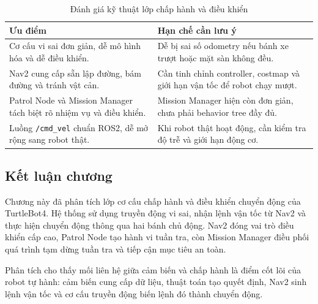 \begin{table}[H]
    \centering
    \caption{Đánh giá kỹ thuật lớp chấp hành và điều khiển}
    \label{tab:actuator-control-assessment}
    \renewcommand{\arraystretch}{1.25}
    \small
    \begin{tabularx}{\textwidth}{|>{\raggedright\arraybackslash}X|>{\raggedright\arraybackslash}X|}
        \hline
        \textbf{Ưu điểm} & \textbf{Hạn chế cần lưu ý} \\
        \hline
        Cơ cấu vi sai đơn giản, dễ mô hình hóa và dễ điều khiển. & Dễ bị sai số odometry nếu bánh xe trượt hoặc mặt sàn không đều. \\
        \hline
        Nav2 cung cấp sẵn lập đường, bám đường và tránh vật cản. & Cần tinh chỉnh controller, costmap và giới hạn vận tốc để robot chạy mượt. \\
        \hline
        Patrol Node và Mission Manager tách biệt rõ nhiệm vụ và điều khiển. & Mission Manager hiện còn đơn giản, chưa phải behavior tree đầy đủ. \\
        \hline
        Luồng \texttt{/cmd\_vel} chuẩn ROS2, dễ mở rộng sang robot thật. & Khi robot thật hoạt động, cần kiểm tra độ trễ và giới hạn động cơ. \\
        \hline
    \end{tabularx}
\end{table}

\subsection{Kết luận chương}
\label{subsec:actuator-control-conclusion}

Chương này đã phân tích lớp cơ cấu chấp hành và điều khiển chuyển động của TurtleBot4. Hệ thống sử dụng truyền động vi sai, nhận lệnh vận tốc từ Nav2 và thực hiện chuyển động thông qua hai bánh chủ động. Nav2 đóng vai trò điều khiển cấp cao, Patrol Node tạo hành vi tuần tra, còn Mission Manager điều phối quá trình tạm dừng tuần tra và tiếp cận mục tiêu an toàn.

Phân tích cho thấy mối liên hệ giữa cảm biến và chấp hành là điểm cốt lõi của robot tự hành: cảm biến cung cấp dữ liệu, thuật toán tạo quyết định, Nav2 sinh lệnh vận tốc và cơ cấu truyền động biến lệnh đó thành chuyển động.